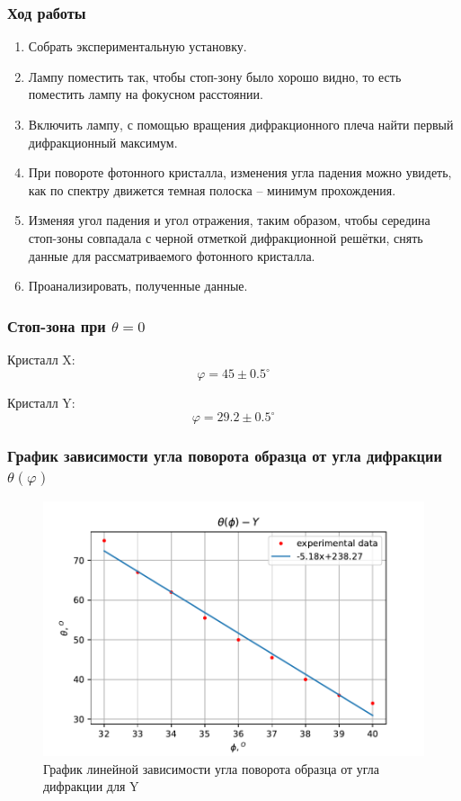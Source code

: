 \documentclass[a4paper, 12pt]{article}
\renewcommand{\phi}{\varphi} %
\begin{document}
\subsubsection{Ход работы}
\begin{enumerate}
\item Собрать экспериментальную установку.
\item Лампу поместить так, чтобы стоп-зону было хорошо видно, то есть поместить лампу на фокусном расстоянии.
\item Включить лампу, с помощью вращения дифракционного плеча найти первый дифракционный максимум.
\item При повороте фотонного кристалла, изменения угла падения можно увидеть, как по спектру движется темная полоска – минимум прохождения.
\item Изменяя угол падения и угол отражения, таким образом, чтобы середина стоп-зоны совпадала с черной отметкой дифракционной решётки, снять данные для рассматриваемого фотонного кристалла.
\item Проанализировать, полученные данные.
\end{enumerate}

\subsubsection{Стоп-зона при $\theta = 0$}
Кристалл X:\\
\begin{equation}
\phi = 45 \pm 0.5 ^\circ
\end{equation}

Кристалл Y:\\
\begin{equation}
\phi = 29.2\pm 0.5^\circ
\end{equation}

\subsubsection{График зависимости угла поворота образца от угла дифракции $\theta(\phi)$}
\begin{figure}[H]
	\centering
	\includegraphics[scale=0.8]{Y_green_1}
	\caption{График линейной зависимости угла поворота образца от угла дифракции для Y}
	\label{im:6}
\end{figure}
\end{document}
